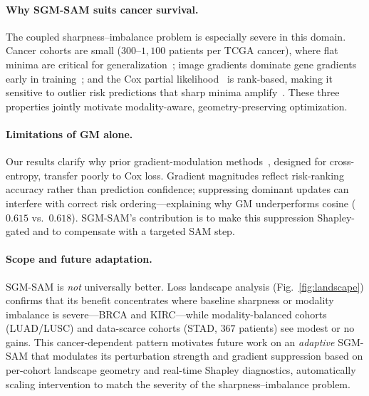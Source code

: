 \documentclass[runningheads]{llncs}
\begin{document}
\paragraph{Why SGM-SAM suits cancer survival.}
The coupled sharpness--imbalance problem is especially severe in this
domain. Cancer cohorts are small ($300$--$1{,}100$ patients per TCGA
cancer), where flat minima are critical for
generalization~\cite{hochreiter1997flat, keskar2017largebatch,
andriushchenko2023sam}; image gradients dominate gene gradients early
in training~\cite{wang2020what, peng2022ogm}; and the Cox partial
likelihood~\cite{cox1972, katzman2018} is rank-based, making it
sensitive to outlier risk predictions that sharp minima
amplify~\cite{harrell1996}. These three properties jointly motivate
modality-aware, geometry-preserving optimization.

\paragraph{Limitations of GM alone.}
Our results clarify why prior gradient-modulation
methods~\cite{peng2022ogm, du2023unimodal, fan2023pmr}, designed for
cross-entropy, transfer poorly to Cox loss. Gradient magnitudes reflect
risk-ranking accuracy rather than prediction confidence; suppressing
dominant updates can interfere with correct risk ordering---explaining
why GM underperforms cosine ($0.615$ vs.\ $0.618$). SGM-SAM's contribution is to make
this suppression Shapley-gated and to compensate with a targeted SAM
step.

\paragraph{Scope and future adaptation.}
SGM-SAM is \textit{not} universally better. Loss landscape
analysis (Fig.~\ref{fig:landscape}) confirms that its benefit
concentrates where baseline sharpness or modality imbalance is
severe---BRCA and KIRC---while modality-balanced cohorts (LUAD/LUSC)
and data-scarce cohorts (STAD, $367$ patients) see modest or no gains.
This cancer-dependent pattern motivates future work on an
\textit{adaptive} SGM-SAM that modulates its perturbation strength
and gradient suppression based on per-cohort landscape geometry and
real-time Shapley diagnostics, automatically scaling intervention to
match the severity of the sharpness--imbalance problem.
\end{document}
